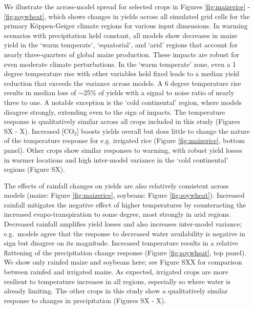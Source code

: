 \documentclass[gmd, manuscript]{copernicus} %
\begin{document}

We illustrate the across-model spread for selected crops in Figures \ref{fig:maizerice} - \ref{fig:soywheat}, which shows changes in yields across all simulated grid cells for the primary K\"{o}ppen-Geiger climate regions \citep{rubel2010} for various input dimensions.
In warming scenarios with precipitation held constant, all models show decreases in maize yield in the `warm temperate', `equatorial', and `arid' regions that account for nearly three-quarters of global maize production. 
These impacts are robust for even moderate climate perturbations.
In the `warm temperate' zone, even a 1 degree temperature rise with other variables held fixed leads to a median yield reduction that exceeds the variance across models. 
A 6 degree temperature rise results in median loss of $\sim$25\% of yields with a signal to noise ratio of nearly three to one. A notable exception is the `cold continental' region, where models disagree strongly, extending even to the sign of impacts. 
The temperature response is qualitatively similar across all crops included in this study (Figures SX - X).
Increased [CO$_2$] boosts yields overall but does little to change the nature of the temperature response for e.g. irrigated rice (Figure \ref{fig:maizerice}, bottom panel).
Other crops show similar responses to warming, with robust yield losses in warmer locations and high inter-model variance in the `cold continental' regions (Figure SX).

The effects of rainfall changes on yields are also relatively consistent across models (maize: Figure \ref{fig:maizerice}, soybeans: Figure \ref{fig:soywheat}). 
Increased rainfall mitigates the negative effect of higher temperatures by counteracting the increased evapo-transpiration to some degree, most strongly in arid regions.
Decreased rainfall amplifies yield losses and also increases inter-model variance; e.g.\ models agree that the response to decreased water availability is negative in sign but disagree on its magnitude.
Increased temperature results in a relative flattening of the precipitation change response (Figure \ref{fig:soywheat}, top panel).
We show only rainfed maize and soybeans here; see Figure SXX for comparison between rainfed and irrigated maize. 
As expected, irrigated crops are more resilient to temperature increases in all regions, especially so where water is already limiting. 
The other crops in this study show a qualitatively similar response to changes in precipitation (Figures SX - X).
\end{document}
